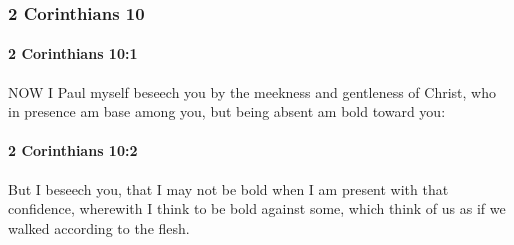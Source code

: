 	\subsubsection{2 Corinthians 10} %
		\label{2CORINTHIANS-10}
		
		\paragraph{2 Corinthians 10:1} %
			\label{2CORINTHIANS-10-1}

			NOW I Paul myself beseech you by the meekness and gentleness of Christ, who in presence am base among you, but being absent am bold toward you:

			\begin{framed}
			\scriptsize
				\begin{compactdesc}
					\item[SBLG] 
				\end{compactdesc}
			\end{framed}

		\paragraph{2 Corinthians 10:2} %
			\label{2CORINTHIANS-10-2}

			But I beseech you, that I may not be bold when I am present with that confidence, wherewith I think to be bold against some, which think of us as if we walked according to the flesh.

